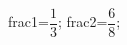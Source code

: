 \documentclass[exercice]{thedocument}%
\begin{document}
%
    \>frac1=$\dfrac13$;%
    \>frac2=$\dfrac68$;%
\end{document}
